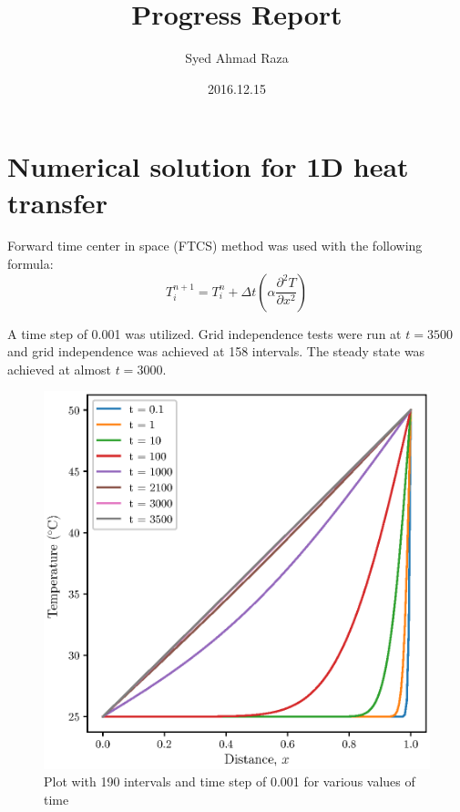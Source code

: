 \documentclass[12pt,a4paper,fleqn]{article}
\title{Progress Report}
\author{Syed Ahmad Raza}
\date{2016.12.15}
\begin{document}
\maketitle
\section*{Numerical solution for 1D heat transfer}
Forward time center in space (FTCS) method was used with the following formula:
\begin{equation}
T_i^{n+1} = T_i^n + \Delta t(\alpha \frac{\partial^2T}{\partial x^2})
\end{equation}

A time step of 0.001 was utilized. Grid independence tests were run at $t =
3500$ and grid independence was achieved at 158 intervals. The steady state was achieved at almost $t = 3000$.


\begin{figure}[p!]
\centering
\includegraphics[width=\linewidth]{ht1dn158.eps}
\caption{Plot with 190 intervals and time step of 0.001 for various values of
time}
\end{figure}
\end{document}
